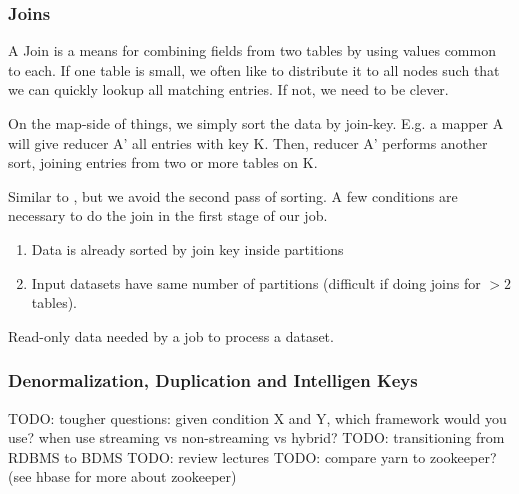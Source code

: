 \subsubsection{Joins}
A Join is a means for combining fields from two tables by using values common to each.
If one table is small, we often like to distribute it to all nodes such that we 
can quickly lookup all matching entries. If not, we need to be clever.


\begin{definition}\label{def:reducejoin}
    On the map-side of things, we simply sort the data by join-key. E.g. a mapper A
    will give reducer A' all entries with key K. Then, reducer A' performs another sort,
    joining entries from two or more tables on K.
\end{definition}


\begin{definition}\label{def:mapjoin}
    Similar to , but we avoid the second pass of sorting.
    A few conditions are necessary to do the join in the first stage of our job.
    \begin{enumerate}
        \item Data is already sorted by join key inside partitions
        \item Input datasets have same number of partitions (difficult if doing joins 
            for $> 2$ tables).
    \end{enumerate}
\end{definition}

\begin{definition}\label{def:sidedata}
    Read-only data needed by a job to process a dataset.
\end{definition}


\subsubsection{Denormalization, Duplication and Intelligen Keys}\label{sec:DDI}
TODO: tougher questions: given condition X and Y, which framework would you use?
    when use streaming vs non-streaming vs hybrid?
TODO: transitioning from RDBMS to BDMS
TODO: review lectures
TODO:  compare yarn to zookeeper? (see hbase for more about zookeeper)
